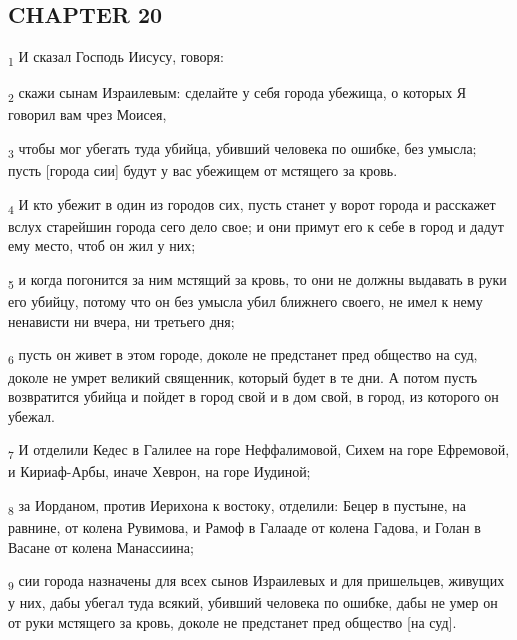 \subsection{CHAPTER 20}
\begin{tcolorbox}
\textsubscript{1} И сказал Господь Иисусу, говоря:
\end{tcolorbox}
\begin{tcolorbox}
\textsubscript{2} скажи сынам Израилевым: сделайте у себя города убежища, о которых Я говорил вам чрез Моисея,
\end{tcolorbox}
\begin{tcolorbox}
\textsubscript{3} чтобы мог убегать туда убийца, убивший человека по ошибке, без умысла; пусть [города сии] будут у вас убежищем от мстящего за кровь.
\end{tcolorbox}
\begin{tcolorbox}
\textsubscript{4} И кто убежит в один из городов сих, пусть станет у ворот города и расскажет вслух старейшин города сего дело свое; и они примут его к себе в город и дадут ему место, чтоб он жил у них;
\end{tcolorbox}
\begin{tcolorbox}
\textsubscript{5} и когда погонится за ним мстящий за кровь, то они не должны выдавать в руки его убийцу, потому что он без умысла убил ближнего своего, не имел к нему ненависти ни вчера, ни третьего дня;
\end{tcolorbox}
\begin{tcolorbox}
\textsubscript{6} пусть он живет в этом городе, доколе не предстанет пред общество на суд, доколе не умрет великий священник, который будет в те дни. А потом пусть возвратится убийца и пойдет в город свой и в дом свой, в город, из которого он убежал.
\end{tcolorbox}
\begin{tcolorbox}
\textsubscript{7} И отделили Кедес в Галилее на горе Неффалимовой, Сихем на горе Ефремовой, и Кириаф-Арбы, иначе Хеврон, на горе Иудиной;
\end{tcolorbox}
\begin{tcolorbox}
\textsubscript{8} за Иорданом, против Иерихона к востоку, отделили: Бецер в пустыне, на равнине, от колена Рувимова, и Рамоф в Галааде от колена Гадова, и Голан в Васане от колена Манассиина;
\end{tcolorbox}
\begin{tcolorbox}
\textsubscript{9} сии города назначены для всех сынов Израилевых и для пришельцев, живущих у них, дабы убегал туда всякий, убивший человека по ошибке, дабы не умер он от руки мстящего за кровь, доколе не предстанет пред общество [на суд].
\end{tcolorbox}

